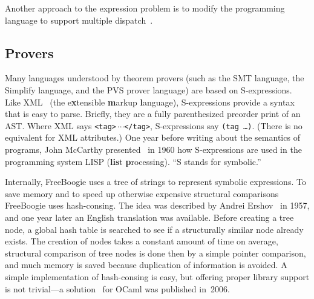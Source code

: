 \documentclass{llncs}
\def\fb#1{{\bf #1}} %
\begin{document}
Another approach to the expression problem is to
modify the programming language to support multiple
dispatch~\cite{chambers1994mm,clifton2006}.

\subsection{Provers} %

Many languages understood by theorem provers (such as the SMT
language, the Simplify language, and the PVS prover language)
are based on S-expressions. Like XML~\cite{bray2006xml} (the
e\textbf{x}tensible \fb markup \fb language), S-expressions
provide a syntax that is easy to parse. Briefly, they are a fully
parenthesized preorder print of an AST\null. Where XML says
\texttt{<tag>$\,\cdots$</tag>}, S-expressions say \texttt{(tag
\dots)}. (There is no equivalent for XML attributes.) One year
before writing about the semantics of programs, John McCarthy
presented~\cite{mccarthy1960} in 1960 how S-expressions are used
in the programming system LISP (\textbf{lis}t \fb processing).
``S stands for symbolic.''

Internally, FreeBoogie uses a tree of strings to represent
symbolic expressions. To save memory and to speed up otherwise
expensive structural comparisons FreeBoogie uses hash-consing.
The idea was described by Andrei Ershov~\cite{ershov1958} in
1957, and one year later an English translation was available.
Before creating a tree node, a global hash table is searched to
see if a structurally similar node already exists. The creation
of nodes takes a constant amount of time on average, structural
comparison of tree nodes is done then by a simple pointer
comparison, and much memory is saved because duplication of
information is avoided. A simple implementation of hash-consing
is easy, but offering proper library support is not trivial---a
solution~\cite{filliatre2006hash} for OCaml was published
in~2006.
\end{document}
